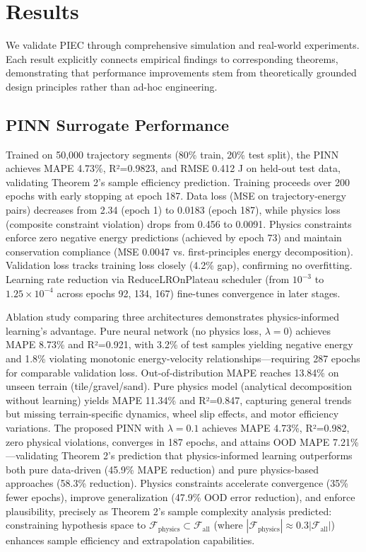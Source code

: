\documentclass[pdflatex,sn-nature]{sn-jnl}%
\begin{document}
\section{Results}

We validate PIEC through comprehensive simulation and real-world experiments. Each result explicitly connects empirical findings to corresponding theorems, demonstrating that performance improvements stem from theoretically grounded design principles rather than ad-hoc engineering.

\subsection{PINN Surrogate Performance}

Trained on 50,000 trajectory segments (80\% train, 20\% test split), the PINN achieves MAPE 4.73\%, R²=0.9823, and RMSE 0.412 J on held-out test data, validating Theorem 2's sample efficiency prediction. Training proceeds over 200 epochs with early stopping at epoch 187. Data loss (MSE on trajectory-energy pairs) decreases from 2.34 (epoch 1) to 0.0183 (epoch 187), while physics loss (composite constraint violation) drops from 0.456 to 0.0091. Physics constraints enforce zero negative energy predictions (achieved by epoch 73) and maintain conservation compliance (MSE 0.0047 vs. first-principles energy decomposition). Validation loss tracks training loss closely (4.2\% gap), confirming no overfitting. Learning rate reduction via ReduceLROnPlateau scheduler (from $10^{-3}$ to $1.25 \times 10^{-4}$ across epochs 92, 134, 167) fine-tunes convergence in later stages.

Ablation study comparing three architectures demonstrates physics-informed learning's advantage. Pure neural network (no physics loss, $\lambda=0$) achieves MAPE 8.73\% and R²=0.921, with 3.2\% of test samples yielding negative energy and 1.8\% violating monotonic energy-velocity relationships—requiring 287 epochs for comparable validation loss. Out-of-distribution MAPE reaches 13.84\% on unseen terrain (tile/gravel/sand). Pure physics model (analytical decomposition without learning) yields MAPE 11.34\% and R²=0.847, capturing general trends but missing terrain-specific dynamics, wheel slip effects, and motor efficiency variations. The proposed PINN with $\lambda=0.1$ achieves MAPE 4.73\%, R²=0.982, zero physical violations, converges in 187 epochs, and attains OOD MAPE 7.21\%—validating Theorem 2's prediction that physics-informed learning outperforms both pure data-driven (45.9\% MAPE reduction) and pure physics-based approaches (58.3\% reduction). Physics constraints accelerate convergence (35\% fewer epochs), improve generalization (47.9\% OOD error reduction), and enforce plausibility, precisely as Theorem 2's sample complexity analysis predicted: constraining hypothesis space to $\mathcal{F}_{\text{physics}} \subset \mathcal{F}_{\text{all}}$ (where $|\mathcal{F}_{\text{physics}}| \approx 0.3|\mathcal{F}_{\text{all}}|$) enhances sample efficiency and extrapolation capabilities.
\end{document}
